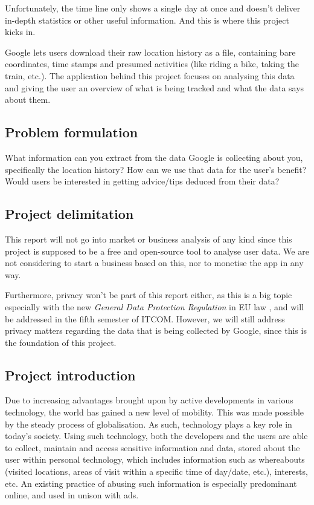 \documentclass[12p]{article}
\begin{document}
Unfortunately, the time line only shows a single day at once and doesn't deliver in-depth statistics or other useful information. And this is where this project kicks in. 

Google lets users download their raw location history as a file, containing bare coordinates, time stamps and presumed activities (like riding a bike, taking the train, etc.). The application behind this project focuses on analysing this data and giving the user an overview of what is being tracked and what the data says about them.

\subsection{Problem formulation} \label{ProblemFormulation}

What information can you extract from the data Google is collecting about you, specifically the location history? How can we use that data for the user’s benefit? Would users be interested in getting advice/tips deduced from their data?

\subsection{Project delimitation} \label{ProjectDelimitations}

This report will not go into market or business analysis of any kind since this project is supposed to be a free and open-source tool to analyse user data. We are not considering to start a business based on this, nor to monetise the app in any way.

Furthermore, privacy won't be part of this report either, as this is a big topic especially with the new \textit{General Data Protection Regulation} in EU law \cite{GDPR}, and will be addressed in the fifth semester of ITCOM. However, we will still address privacy matters regarding the data that is being collected by Google, since this is the foundation of this project.

\subsection{Project introduction} \label{ProjectIntroduction}

Due to increasing advantages brought upon by active developments in various technology, the world has gained a new level of mobility. This was made possible by the steady process of globalisation. As such, technology plays a key role in today's society. Using such technology, both the developers and the users are able to collect, maintain and access sensitive information and data, stored about the user within personal technology, which includes information such as whereabouts (visited locations, areas of visit within a specific time of day/date, etc.), interests, etc. An existing practice of abusing such information is especially predominant online, and used in unison with ads.
\end{document}
